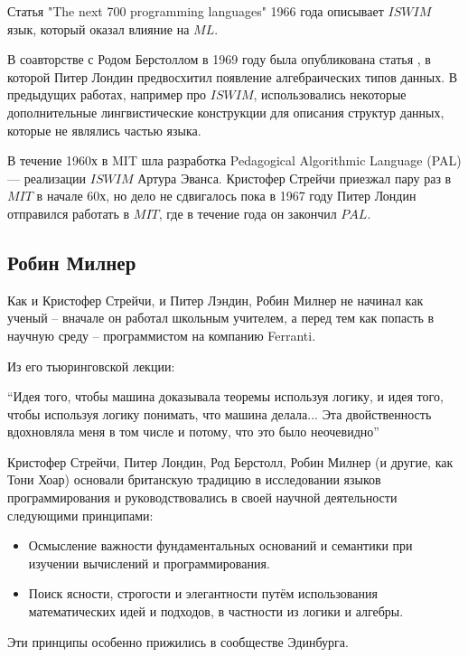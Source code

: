 \documentclass[14pt]{matmex-diploma-custom}
\begin{document}
Статья "The next 700 programming languages" \cite{laundin4} 1966 года описывает $I\!SW\!I\!M$ язык, который оказал влияние на $M\!L$.

В соавторстве с Родом Берстоллом в 1969 году была опубликована статья \cite{laundin5}, в которой Питер Лондин предвосхитил появление алгебраических типов данных. В предыдущих работах, например про $I\!SW\!I\!M$, использовались некоторые дополнительные лингвистические конструкции для описания структур данных, которые не являлись частью языка.

В течение 1960х в MIT шла разработка Pedagogical Algorithmic Language (PAL) --- реализации $I\!SW\!I\!M$ Артура Эванса. Кристофер Стрейчи приезжал пару раз в $MIT$ в начале 60х, но дело не сдвигалось пока в 1967 году Питер Лондин отправился работать в $MIT$, где в течение года он закончил $PAL$.

\subsection{Робин Милнер}

Как и Кристофер Стрейчи, и Питер Лэндин, Робин Милнер не начинал как ученый -- вначале он работал школьным учителем, а перед тем как попасть в научную среду -- программистом на компанию Ferranti.
\begin{framed}
Из его тьюринговской лекции:

“Идея того, чтобы машина доказывала теоремы используя логику, и идея того, чтобы используя логику понимать, что машина делала... Эта двойственность вдохновляла меня в том числе и потому, что это было неочевидно”
\end{framed}

Кристофер Стрейчи, Питер Лондин, Род Берстолл, Робин Милнер (и другие, как Тони Хоар) основали британскую традицию в исследовании языков программирования и руководствовались в своей научной деятельности следующими принципами:

\begin{itemize}
 \item Осмысление важности фундаментальных оснований и семантики при изучении вычислений и программирования.
 \item Поиск ясности, строгости и элегантности путём использования математических идей и подходов, в частности из логики и алгебры.
\end{itemize}

Эти принципы особенно прижились в сообществе Эдинбурга.
 
\end{document}

